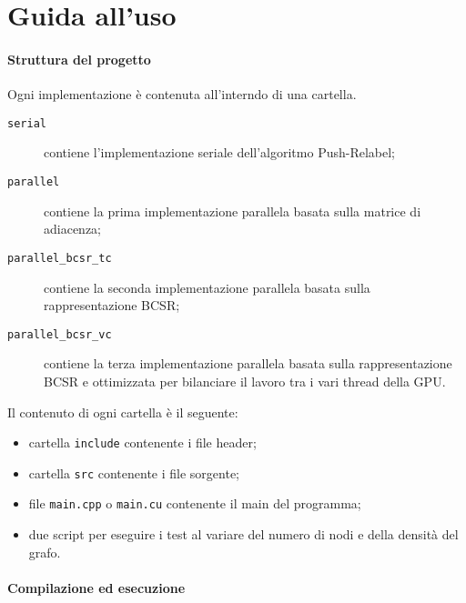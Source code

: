 \chapter{Guida all'uso}\label{app:guida}

    \subsubsection*{Struttura del progetto}

        Ogni implementazione è contenuta all'interndo di una cartella. 
        \begin{description}
            \item[\texttt{serial}] contiene l'implementazione seriale dell'algoritmo Push-Relabel;
            \item[\texttt{parallel}] contiene la prima implementazione parallela basata sulla matrice di adiacenza;
            \item[\texttt{parallel\_bcsr\_tc}] contiene la seconda implementazione parallela basata sulla rappresentazione BCSR;
            \item[\texttt{parallel\_bcsr\_vc}] contiene la terza implementazione parallela basata sulla rappresentazione BCSR e ottimizzata per bilanciare il lavoro tra i vari thread della GPU.  
        \end{description}

        Il contenuto di ogni cartella è il seguente:
        \begin{itemize}
            \item cartella \texttt{include} contenente i file header;
            \item cartella \texttt{src} contenente i file sorgente;
            \item file \texttt{main.cpp} o \texttt{main.cu} contenente il main del programma;
            \item due script per eseguire i test al variare del numero di nodi e della densità del grafo. 
        \end{itemize}


    \subsubsection*{Compilazione ed esecuzione}

